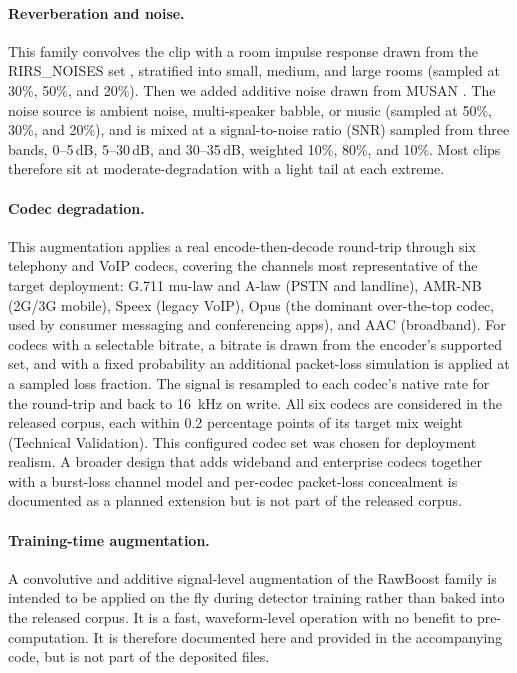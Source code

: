 \documentclass[11pt]{article}
\begin{document}
\paragraph{Reverberation and noise.} This family convolves the clip with
a room impulse response drawn from the RIRS\_NOISES set \citep{ko2017rir},
stratified into small, medium, and large rooms (sampled at 30\%, 50\%,
and 20\%). Then we added additive noise drawn from MUSAN \citep{musan}. The
noise source is ambient noise, multi-speaker babble, or music (sampled
at 50\%, 30\%, and 20\%), and is mixed at a signal-to-noise ratio (SNR)
sampled from three bands, 0--5\,dB, 5--30\,dB, and 30--35\,dB, weighted
10\%, 80\%, and 10\%. Most clips therefore sit at moderate-degradation with a light tail at each extreme.

\paragraph{Codec degradation.} This augmentation applies a real
encode-then-decode round-trip through six telephony and VoIP codecs,
covering the channels most representative of the target deployment:
G.711 mu-law and A-law (PSTN and landline), AMR-NB (2G/3G mobile), Speex
(legacy VoIP), Opus (the dominant over-the-top codec, used by consumer
messaging and conferencing apps), and AAC (broadband). 
For codecs with a selectable bitrate, a bitrate is drawn
from the encoder's supported set, and with a fixed probability an
additional packet-loss simulation is applied at a sampled loss fraction.
The signal is resampled to each codec's native rate for the round-trip
and back to \SI{16}{\kilo\hertz} on write. All six codecs are considered
in the released corpus, each within 0.2 percentage points of its target
mix weight (Technical Validation). This configured codec set was chosen
for deployment realism. A broader design that adds wideband and
enterprise codecs together with a burst-loss channel model and per-codec
packet-loss concealment is documented as a planned extension but is not
part of the released corpus.

\paragraph{Training-time augmentation.} A convolutive and additive
signal-level augmentation of the RawBoost family \citep{tak2022ssl} is
intended to be applied on the fly during detector training rather than
baked into the released corpus. It is a fast, waveform-level operation with no benefit to
pre-computation. It is therefore documented here and provided in the
accompanying code, but is not part of the deposited files.
\end{document}
